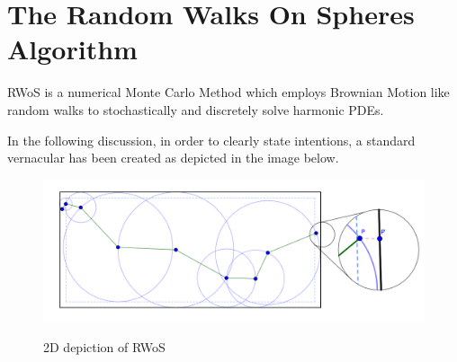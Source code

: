 %
%

\section{The Random Walks On Spheres Algorithm}
\Gls{RWoS} is a numerical Monte Carlo Method which employs Brownian Motion
like random walks to stochastically and discretely solve
harmonic \glspl{PDE}.
\par

In the following discussion, in order to clearly state intentions, a standard
vernacular has been created as depicted in the image below.

\begin{figure}
\includegraphics[width=15.0cm]{styles/WoS} \label{diagram}
  \caption{2D depiction of \Gls{RWoS}}
\end{figure}

